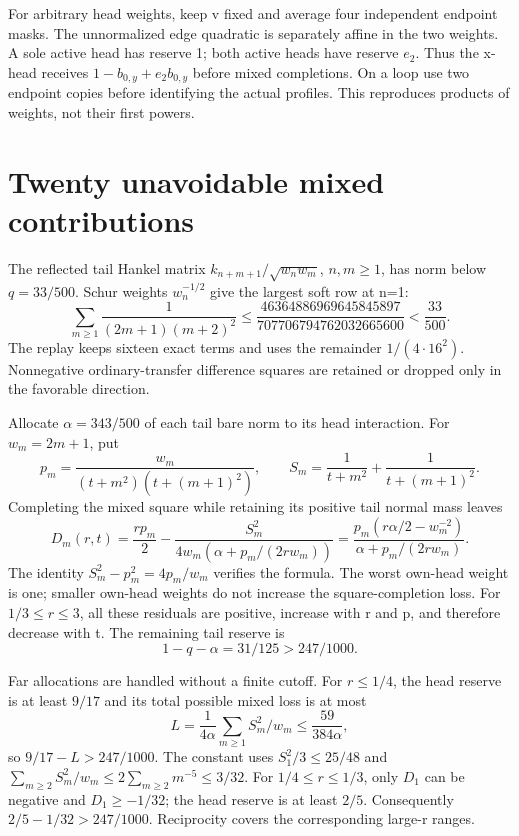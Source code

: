 \documentclass[11pt]{article}
\begin{document}
For arbitrary head weights, keep v fixed and average four independent endpoint masks. The unnormalized edge quadratic is separately affine in the two weights. A sole active head has reserve 1; both active heads have reserve $e_2$. Thus the x-head receives $1-b_{0,y}+e_2b_{0,y}$ before mixed completions. On a loop use two endpoint copies before identifying the actual profiles. This reproduces products of weights, not their first powers.

\section{Twenty unavoidable mixed contributions}
The reflected tail Hankel matrix $k_{n+m+1}/\sqrt{w_nw_m}$, $n,m\ge1$, has norm below $q=33/500$. Schur weights $w_n^{-1/2}$ give the largest soft row at n=1:
\[
 \sum_{m\ge1}\frac1{(2m+1)(m+2)^2}
 \le\frac{46364886969645845897}{707706794762032665600}<\frac{33}{500}.
\]
The replay keeps sixteen exact terms and uses the remainder $1/(4\cdot16^2)$. Nonnegative ordinary-transfer difference squares are retained or dropped only in the favorable direction.

Allocate $\alpha=343/500$ of each tail bare norm to its head interaction. For $w_m=2m+1$, put
\[
 p_m=\frac{w_m}{(t+m^2)(t+(m+1)^2)},\qquad
 S_m=\frac1{t+m^2}+\frac1{t+(m+1)^2}.
\]
Completing the mixed square while retaining its positive tail normal mass leaves
\begin{equation}
 D_m(r,t)=\frac{rp_m}{2}-\frac{S_m^2}{4w_m(\alpha+p_m/(2rw_m))}
 =\frac{p_m(r\alpha/2-w_m^{-2})}{\alpha+p_m/(2rw_m)}.\label{eq:completion}
\end{equation}
The identity $S_m^2-p_m^2=4p_m/w_m$ verifies the formula. The worst own-head weight is one; smaller own-head weights do not increase the square-completion loss. For $1/3\le r\le3$, all these residuals are positive, increase with r and p, and therefore decrease with t. The remaining tail reserve is
\[
 1-q-\alpha=31/125>247/1000.
\]

Far allocations are handled without a finite cutoff. For $r\le1/4$, the head reserve is at least $9/17$ and its total possible mixed loss is at most
\[
 L=\frac1{4\alpha}\sum_{m\ge1}S_m^2/w_m\le\frac{59}{384\alpha},
\]
so $9/17-L>247/1000$. The constant uses $S_1^2/3\le25/48$ and $\sum_{m\ge2}S_m^2/w_m\le2\sum_{m\ge2}m^{-5}\le3/32$. For $1/4\le r\le1/3$, only $D_1$ can be negative and $D_1\ge-1/32$; the head reserve is at least $2/5$. Consequently $2/5-1/32>247/1000$. Reciprocity covers the corresponding large-r ranges.
\end{document}
